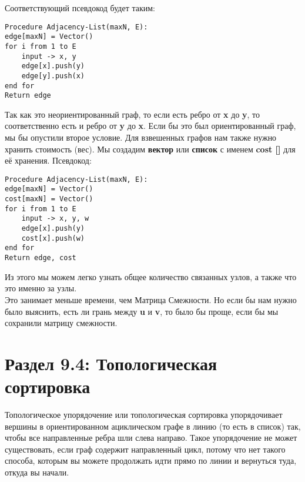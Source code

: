 \vspace{\baselineskip}

Соответствующий псевдокод будет таким:

\begin{tcolorbox}
\begin{verbatim}
Procedure Adjacency-List(maxN, E):
edge[maxN] = Vector()
for i from 1 to E
	input -> x, y
	edge[x].push(y)
	edge[y].push(x)
end for
Return edge
\end{verbatim}
\end{tcolorbox}

Так как это неориентированный граф, то если есть ребро от \textbf{x} до \textbf{y}, то соответственно есть и ребро от \textbf{y} до \textbf{x}. Если бы это был ориентированный граф, мы бы опустили второе условие. Для взвешенных графов нам также нужно хранить стоимость (вес). Мы создадим \textbf{вектор} или \textbf{список} с именем \textbf{cost []} для её хранения. Псевдокод:

\begin{tcolorbox}
\begin{verbatim}
Procedure Adjacency-List(maxN, E):
edge[maxN] = Vector()
cost[maxN] = Vector()
for i from 1 to E
	input -> x, y, w
	edge[x].push(y)
	cost[x].push(w)
end for
Return edge, cost
\end{verbatim}
\end{tcolorbox}

Из этого мы можем легко узнать общее количество связанных узлов, а также что это именно за узлы. \\
Это занимает меньше времени, чем Матрица Смежности. Но если бы нам нужно было выяснить, есть ли грань между \textbf{u} и \textbf{v}, то было бы проще, если бы мы сохранили матрицу смежности.

\section*{Раздел 9.4: Топологическая сортировка}

Топологическое упорядочение или топологическая сортировка упорядочивает вершины в ориентированном ациклическом графе в линию (то есть в список) так, чтобы все направленные ребра шли слева направо. Такое упорядочение не может существовать, если граф содержит направленный цикл, потому что нет такого способа, которым вы можете продолжать идти прямо по линии и вернуться туда, откуда вы начали.

\vspace{\baselineskip}

